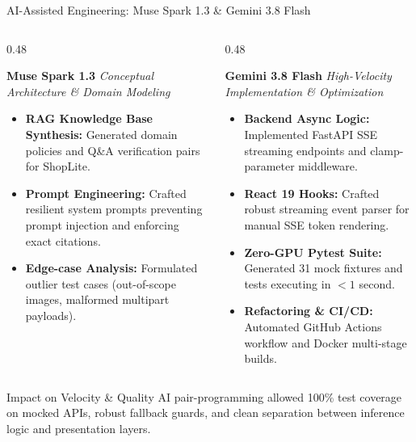 \documentclass[aspectratio=169, 10pt]{beamer}
\begin{document}
\begin{frame}{AI-Assisted Engineering: Muse Spark 1.3 \& Gemini 3.8 Flash}
  \begin{columns}[T]
    \begin{column}{0.48\textwidth}
      \begin{block}{\textbf{Muse Spark 1.3}}
        \textit{Conceptual Architecture \& Domain Modeling}
        \begin{itemize}
          \item \textbf{RAG Knowledge Base Synthesis:} Generated domain policies and Q\&A verification pairs for ShopLite.
          \item \textbf{Prompt Engineering:} Crafted resilient system prompts preventing prompt injection and enforcing exact citations.
          \item \textbf{Edge-case Analysis:} Formulated outlier test cases (out-of-scope images, malformed multipart payloads).
        \end{itemize}
      \end{block}
    \end{column}

    \begin{column}{0.48\textwidth}
      \begin{block}{\textbf{Gemini 3.8 Flash}}
        \textit{High-Velocity Implementation \& Optimization}
        \begin{itemize}
          \item \textbf{Backend Async Logic:} Implemented FastAPI SSE streaming endpoints and clamp-parameter middleware.
          \item \textbf{React 19 Hooks:} Crafted robust streaming event parser for manual SSE token rendering.
          \item \textbf{Zero-GPU Pytest Suite:} Generated 31 mock fixtures and tests executing in $<1$ second.
          \item \textbf{Refactoring \& CI/CD:} Automated GitHub Actions workflow and Docker multi-stage builds.
        \end{itemize}
      \end{block}
    \end{column}
  \end{columns}

  \vspace{0.25cm}
  \begin{exampleblock}{Impact on Velocity \& Quality}
    AI pair-programming allowed 100\% test coverage on mocked APIs, robust fallback guards, and clean separation between inference logic and presentation layers.
  \end{exampleblock}
\end{frame}
\end{document}
